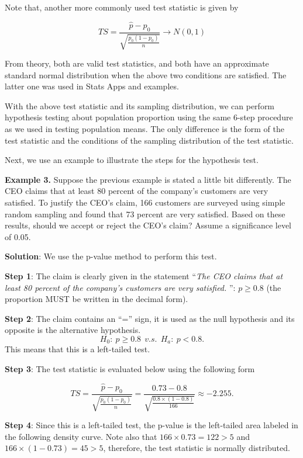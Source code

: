 \documentclass[
]{book}
\begin{document}
Note that, another more commonly used test statistic is given by

\[
TS = \frac{\hat{p}-p_0}{\sqrt{\frac{p_0(1-p_0)}{n}}} \to N(0,1)
\]

From theory, both are valid test statistics, and both have an approximate standard normal distribution when the above two conditions are satisfied. The latter one was used in Stats Apps and examples.

With the above test statistic and its sampling distribution, we can perform hypothesis testing about population proportion using the same 6-step procedure as we used in testing population means. The only difference is the form of the test statistic and the conditions of the sampling distribution of the test statistic.

Next, we use an example to illustrate the steps for the hypothesis test.

\textbf{Example 3.} Suppose the previous example is stated a little bit differently. The CEO claims that at least 80 percent of the company's customers are very satisfied. To justify the CEO's claim, 166 customers are surveyed using simple random sampling and found that 73 percent are very satisfied. Based on these results, should we accept or reject the CEO's claim? Assume a significance level of 0.05.

\textbf{Solution}: We use the p-value method to perform this test.

\textbf{Step 1}: The claim is clearly given in the statement ``\emph{The CEO claims that at least 80 percent of the company's customers are very satisfied. }'': \(p \ge 0.8\) (the proportion MUST be written in the decimal form).

\textbf{Step 2}: The claim contains an ``='' sign, it is used as the null hypothesis and its opposite is the alternative hypothesis.
\[H_0: \ p \ge 0.8  \ \  v.s.  \  \  H_a: \  p < 0.8.\]
This means that this is a left-tailed test.

\textbf{Step 3}: The test statistic is evaluated below using the following form

\[
TS = \frac{\hat{p}-p_0}{\sqrt{\frac{p_0(1-p_0)}{n}}}  =  \frac{0.73-0.8}{\sqrt{\frac{0.8\times (1-0.8)}{166}}} \approx -2.255.
\]

\textbf{Step 4}: Since this is a left-tailed test, the p-value is the left-tailed area labeled in the following density curve. Note also that \(166\times 0.73 = 122 > 5\) and \(166 \times (1 - 0.73) = 45 > 5\), therefore, the test statistic is normally distributed.
\end{document}
